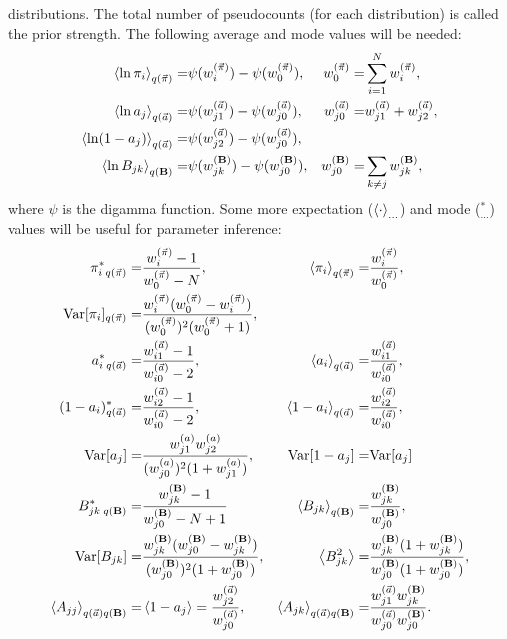 distributions.  The total number of pseudocounts (for each
distribution) is called the prior strength. The following average and
mode values will be needed:
\begin{align}
  \left\langle \ln \pi_i\right\rangle_{q(\vec{\pi})}=&\psi(w_i^{(\vec{\pi})})-\psi(w_0^{(\vec{\pi})}),
  &w_0^{(\vec{\pi})}=&\sum_{i=1}^Nw_i^{(\vec{\pi})},\label{lnpiaverage}\\
  \left\langle \ln a_j\right\rangle_{q(\vec{a})}=&\psi(w_{j1}^{(\vec{a})})-\psi(w_{j0}^{(\vec{a})}),&
  w_{j0}^{(\vec{a})}=&w_{j1}^{(\vec{a})}+w_{j2}^{(\vec{a})},\\
  \left\langle \ln (1-a_j)\right\rangle_{q(\vec{a})}=&\psi(w_{j2}^{(\vec{a})})-\psi(w_{j0}^{(\vec{a})}),\\
  \left\langle \ln B_{jk}\right\rangle_{q(\mathbf{B})}=&\psi(w_{jk}^{(\mathbf{B})})
    -\psi(w_{j0}^{(\mathbf{B})}),&
  w_{j0}^{(\mathbf{B})}=&\sum_{k\ne j}w_{jk}^{(\mathbf{B})},
\end{align}
where $\psi$ is the digamma function.  Some more expectation
($\left\langle \cdot\right\rangle_{\ldots}$) and mode ($^*_{\ldots}$) values will be
useful for parameter inference:
\begin{align}
  \pi^*_{i\;q(\vec\pi)}=&\frac{w_i^{(\vec\pi)}-1}{w_0^{(\vec\pi)}-N}, &
  \left\langle \pi_i\right\rangle_{q(\vec{\pi})}=&\frac{w_i^{(\vec\pi)}}{w_0^{(\vec\pi)}}, \\
  \text{Var}[\pi_i]_{q(\vec{\pi})}=&
  \frac{w_i^{(\vec\pi)}(w_0^{(\vec\pi)}-w_i^{(\vec\pi)})}{
    (w_0^{(\vec\pi)})^2(w_0^{(\vec\pi)}+1)},\\
  a^*_{i\;q(\vec a)}=&\frac{w_{i1}^{(\vec{a})}-1}{w_{i0}^{(\vec{a})}-2}, &
  \left\langle a_i\right\rangle_{q(\vec{a})}=&\frac{w_{i1}^{(\vec{a})}}{w_{i0}^{(\vec{a})}},\\
  (1-a_i)^*_{q(\vec{a})}=&\frac{w_{i2}^{(\vec{a})}-1}{w_{i0}^{(\vec{a})}-2}, &
  \left\langle 1-a_i\right\rangle_{q(\vec{a})}=&\frac{w_{i2}^{(\vec{a})}}{w_{i0}^{(\vec{a})}},\\
  \text{Var}[a_j]=&\frac{w_{j1}^{(a)}w_{j2}^{(a)}}{(w_{j0}^{(a)})^2(1+w_{j1}^{(a)})},&
\text{Var}[1-a_j]=&\text{Var}[a_j]\\
  B^*_{jk\;q(\mathbf{B})}=&\frac{w_{jk}^{(\mathbf{B})}-1}{w_{j0}^{(\mathbf{B})}-N+1}&
  \left\langle B_{jk}\right\rangle_{q(\mathbf{B})}=&\frac{w_{jk}^{(\mathbf{B})}}{w_{j0}^{(\mathbf{B})}},\\
\text{Var}[B_{jk}]=&
\frac{w_{jk}^{(\mathbf{B})}(w_{j0}^{(\mathbf{B})}-w_{jk}^{(\mathbf{B})})}{
(w_{j0}^{(\mathbf{B})})^2(1+w_{j0}^{(\mathbf{B})})},&
\left\langle B_{jk}^2\right\rangle=&\frac{w_{jk}^{(\mathbf{B})}(1+w_{jk}^{(\mathbf{B})})}{
        w_{j0}^{(\mathbf{B})}(1+w_{j0}^{(\mathbf{B})})},\\
\left\langle A_{jj}\right\rangle_{q(\vec{a})q(\mathbf{B})}=&
\left\langle 1-a_j\right\rangle=\frac{w_{j2}^{(\vec{a})}}{w_{j0}^{(\vec{a})}},&
\left\langle A_{jk}\right\rangle_{q(\vec{a})q(\mathbf{B})}=&
\frac{w_{j1}^{(\vec{a})}w_{jk}^{(\mathbf{B})}}{w_{j0}^{(\vec{a})}w_{j0}^{(\mathbf{B})}}.\label{Amean}
\end{align}
